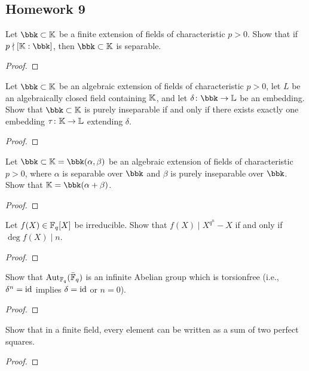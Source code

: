 \subsection{Homework 9}
\begin{problem}
  Let $\bbk\subset\bbK$ be a finite extension of fields of characteristic
  $p>0$. Show that if $p\nmid[\bbK:\bbk]$, then $\bbk\subset\bbK$ is
  separable.
\end{problem}
\begin{proof}
\end{proof}

\begin{problem}
  Let $\bbk\subset\bbK$ be an algebraic extension of fields of
  characteristic $p>0$, let $L$ be an algebraically closed field containing
  $\mathbb{K}$, and let $\delta\colon\bbk\to\bbL$ be an embedding. Show that
  $\bbk\subset\bbK$ is purely inseparable if and only if there exists
  exactly one embedding $\tau\colon\mathbb{K}\to\mathbb{L}$ extending $\delta$.
\end{problem}
\begin{proof}
\end{proof}

\begin{problem}
  Let $\bbk\subset\bbK=\bbk(\alpha,\beta)$ be an algebraic extension of
  fields of characteristic $p>0$, where $\alpha$ is separable over $\bbk$
  and $\beta$ is purely inseparable over $\bbk$. Show that
  $\bbK=\bbk(\alpha+\beta)$.
\end{problem}
\begin{proof}
\end{proof}

\begin{problem}
  Let $f(X)\in\mathbb{F}_q[X]$ be irreducible. Show that $f(X)\mid X^{q^n}-X$ if
  and only if $\deg f(X)\mid n$.
\end{problem}
\begin{proof}
\end{proof}

\begin{problem}
  Show that $\operatorname{Aut}_{\mathbb{F}_q}(\bar{\mathbb{F}}_q)$ is an infinite Abelian group which
  is torsionfree (i.e., $\delta^n=\operatorname{id}$ implies $\delta=\operatorname{id}$ or $n=0$).
\end{problem}
\begin{proof}
\end{proof}

\begin{problem}
  Show that in a finite field, every element can be written as a sum of two
  perfect squares.
\end{problem}
\begin{proof}
\end{proof}

